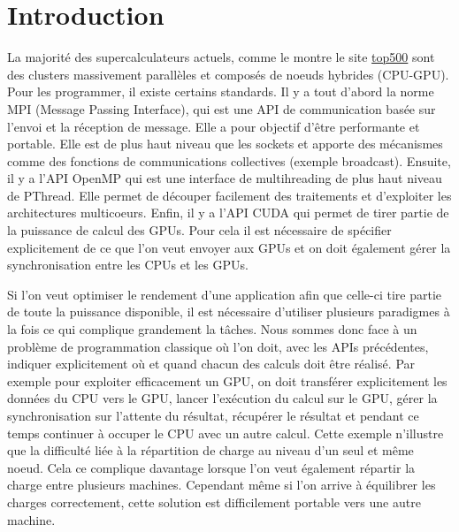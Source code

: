 \documentclass[smallextended]{svjour3}
\begin{document}
\section{Introduction}
\label{sec-1}

La majorité des supercalculateurs actuels, comme le montre le site
\href{http://www.top500.org}{top500} sont des clusters massivement parallèles et composés de
noeuds hybrides (CPU-GPU). Pour les programmer, il existe certains
standards. Il y a tout d'abord la norme MPI (Message Passing
Interface), qui est une API de communication basée sur l'envoi et la  
réception de message. Elle a pour objectif d'être performante et
portable.  Elle est de plus haut niveau que les sockets et apporte
des mécanismes comme des fonctions de communications collectives
(exemple broadcast). Ensuite, il y a l'API OpenMP qui est une
interface de multihreading de plus haut niveau de PThread. Elle
permet de découper facilement des traitements et d'exploiter les
architectures multicoeurs. Enfin, il y a l'API CUDA qui permet de
tirer partie de la puissance de calcul des GPUs. Pour cela il est
nécessaire de spécifier explicitement de ce que l'on veut envoyer
aux GPUs et on doit également gérer la synchronisation entre les
CPUs et les GPUs.

Si l'on veut optimiser le rendement d'une application afin que
celle-ci tire partie de toute la puissance disponible, il est
nécessaire d'utiliser plusieurs paradigmes à la fois ce qui
complique grandement la tâches. Nous sommes donc face à un problème
de programmation classique où l'on doit, avec les APIs précédentes,
indiquer explicitement où et quand chacun des calculs doit être 
réalisé. Par exemple pour exploiter efficacement un GPU, on doit
transférer explicitement les données du CPU vers le GPU, lancer
l'exécution du calcul sur le GPU, gérer la synchronisation sur
l'attente du résultat, récupérer le résultat et pendant ce temps
continuer à occuper le CPU avec un autre calcul. Cette exemple
n'illustre que la difficulté liée à la répartition de charge au
niveau d'un seul et même noeud. Cela ce complique davantage lorsque
l'on veut également répartir la charge entre plusieurs machines. 
Cependant même si l'on arrive à équilibrer les charges correctement,
cette solution est difficilement portable vers une autre machine.  
\end{document}
